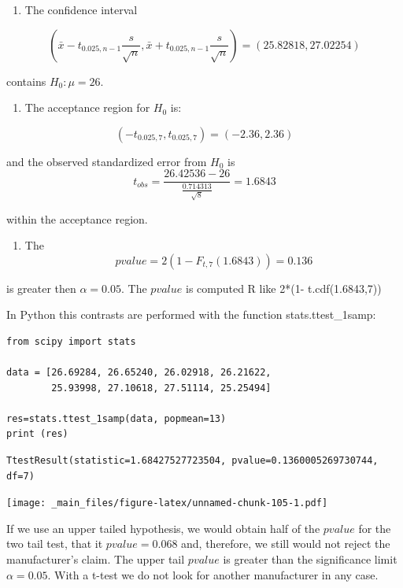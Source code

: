 \documentclass[
]{book}
\providecommand{\tightlist}{%
  \setlength{\itemsep}{0pt}\setlength{\parskip}{0pt}}
\begin{document}
\begin{enumerate}
\def\labelenumi{\arabic{enumi}.}
\tightlist
\item
  The confidence interval
\end{enumerate}

\[(\bar{x}-t_{0.025, n-1} \frac{s}{\sqrt{n}}, \bar{x}+t_{0.025, n-1} \frac{s}{\sqrt{n}})=(25.82818, 27.02254)\]

contains \(H_0:\mu=26\).

\begin{enumerate}
\def\labelenumi{\arabic{enumi}.}
\setcounter{enumi}{1}
\tightlist
\item
  The acceptance region for \(H_0\) is:
\end{enumerate}

\[(-t_{0.025,7}, t_{0.025,7})=( -2.36,  2.36)\]

and the observed standardized error from \(H_0\) is
\[t_{obs} =  \frac{26.42536-26}{\frac{0.714313}{\sqrt{8}}}=1.6843\]

within the acceptance region.

\begin{enumerate}
\def\labelenumi{\arabic{enumi}.}
\setcounter{enumi}{2}
\tightlist
\item
  The \[pvalue=2(1-F_{t,7}(1.6843))=0.136\]
\end{enumerate}

is greater then \(\alpha=0.05\). The \(pvalue\) is computed R like 2*(1- t.cdf(1.6843,7))

In Python this contrasts are performed with the function stats.ttest\_1samp:

\begin{verbatim}
from scipy import stats

data = [26.69284, 26.65240, 26.02918, 26.21622, 
        25.93998, 27.10618, 27.51114, 25.25494]

res=stats.ttest_1samp(data, popmean=13)
print (res)
\end{verbatim}

\begin{verbatim}
TtestResult(statistic=1.68427527723504, pvalue=0.1360005269730744, df=7)
\end{verbatim}

\texttt{[image: \_main\_files/figure-latex/unnamed-chunk-105-1.pdf]}

If we use an upper tailed hypothesis, we would obtain half of the \(pvalue\) for the two tail test, that it \(pvalue=0.068\) and, therefore, we still would not reject the manufacturer's claim. The upper tail \(pvalue\) is greater than the significance limit \(\alpha=0.05\). With a t-test we do not look for another manufacturer in any case.
\end{document}
